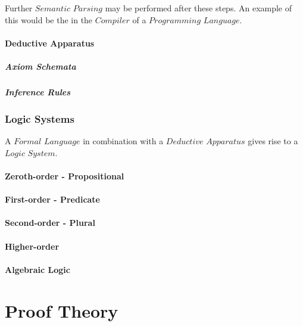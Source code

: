 \documentclass{article}
\begin{document}
    Further $Semantic$ $Parsing$ may be performed after these
    steps. An example of this would be the in the $Compiler$ of a
    $Programming$ $Language$.

\subsection{Deductive Apparatus}

\subsubsection{Axiom Schemata}

\subsubsection{Inference Rules}

\section{Logic Systems}

A $Formal$ $Language$ in combination with a $Deductive$ $Apparatus$
gives rise to a $Logic$ $System$.

\subsection{Zeroth-order - Propositional}

\subsection{First-order - Predicate}

\subsection{Second-order - Plural}

\subsection{Higher-order}

\subsection{Algebraic Logic}



\part{Proof Theory}
\end{document}
